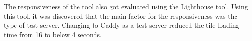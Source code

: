 The responsiveness of the tool also got evaluated using the Lighthouse tool. Using this tool, it was discovered that the main factor for the responsiveness was the type of test server. Changing to Caddy as a test server reduced the tile loading time from 16 to below 4 seconds.


